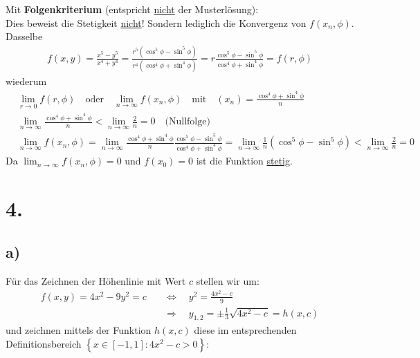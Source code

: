 \documentclass[11pt,a4paper]{article}
\newcommand{\1}    	{\mathbbm{1}}
\begin{document}
	\noindent	
	Mit \textbf{Folgenkriterium} (entspricht \underline{nicht} der Musterlösung): \\
	\color{red} Dies beweist die Stetigkeit \underline{nicht}! Sondern lediglich die Konvergenz von \(f(x_n,\phi)\). \\
	\color{black}
	Dasselbe
	\begin{align*}
		f(x,y) = \frac{x^5 - y^5}{x^4 + y^4} = \frac{r^5 ( \cos^5 \phi - \sin^5 \phi )}{r^4 ( \cos^4 \phi + \sin^4 \phi) } = r \frac{\cos^5 \phi - \sin^5 \phi}{\cos^4 \phi + \sin^4 \phi} = f(r,\phi)
	\end{align*}
	wiederum
	\begin{align*}
		& \lim_{r \rightarrow 0} f(r,\phi) \quad\textrm{oder}\quad
		\lim_{n \rightarrow \infty} f\left( x_n,\phi \right) \quad\textrm{mit}\quad
		(x_n) = \frac{\cos^4 \phi + \sin^4 \phi}{n} \\
		& \lim_{n \rightarrow \infty} \frac{\cos^4 \phi + \sin^4 \phi}{n} < \lim_{n \rightarrow \infty} \frac{2}{n} = 0 \quad \textrm{(Nullfolge)} \\
		& \lim_{n \rightarrow \infty} f\left( x_n,\phi \right)  = 
		\lim_{n \rightarrow \infty} \frac{\cos^4 \phi + \sin^4 \phi}{n} \frac{\cos^5 \phi - \sin^5 \phi}{\cos^4 \phi + \sin^4 \phi} = 
		\lim_{n \rightarrow \infty} \frac{1}{n} (\cos^5 \phi - \sin^5 \phi) < \lim_{n \rightarrow \infty} \frac{2}{n} = 0
	\end{align*}
	Da \( \lim_{n \rightarrow \infty} f\left( x_n,\phi \right) = 0\) und \(f( x_0) = 0\) ist die Funktion \underline{stetig}.
	
	\section*{4.}
	\subsection*{a)}
	Für das Zeichnen der Höhenlinie mit Wert \(c\) stellen wir um:
	\begin{align*}
		f(x,y) = 4x^2 - 9y^2 = c \quad &\Leftrightarrow \quad y^2 = \frac{4x^2 - c}{9} \\
		&\Rightarrow \quad y_{1,2} = \pm \frac{1}{3} \sqrt{4x^2 - c} = h(x,c)
	\end{align*}
	und zeichnen mittels der Funktion \(h(x,c)\) diese im entsprechenden Definitionsbereich \(\left\{ x \in \left[ -1, 1 \right] : 4x^2 - c > 0 \right\} \):
	
\end{document}
